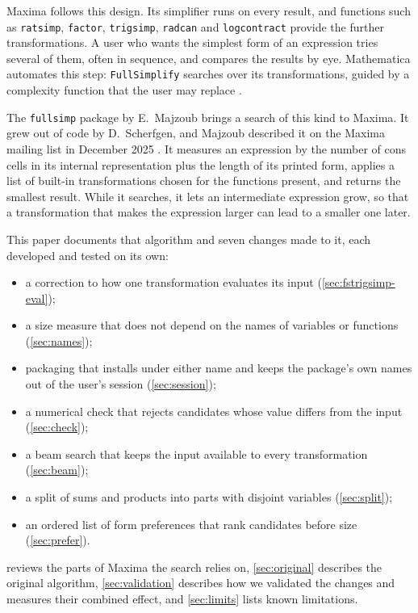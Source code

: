 \documentclass[11pt]{amsart}
\newcommand{\mx}{\lstinline[style=mx]}
\theoremstyle{definition}
\theoremstyle{remark}
\begin{document}
Maxima \cite{Maxima} follows this design. Its simplifier runs on every
result, and functions such as \mx|ratsimp|, \mx|factor|, \mx|trigsimp|,
\mx|radcan| and \mx|logcontract| provide the further transformations. A user
who wants the simplest form of an expression tries several of them, often in
sequence, and compares the results by eye. Mathematica automates this step:
\texttt{FullSimplify} searches over its transformations, guided by a
complexity function that the user may replace \cite{WolframFullSimplify}.

The \texttt{fullsimp} package by E.~Majzoub \cite{fullsimp} brings a search
of this kind to Maxima. It grew out of code by D.~Scherfgen, and Majzoub
described it on the Maxima mailing list in December 2025 \cite{Majzoub25}. It
measures an expression by the number of cons cells in its internal
representation plus the length of its printed form, applies a list of
built-in transformations chosen for the functions present, and returns the
smallest result. While it searches, it lets an intermediate expression grow,
so that a transformation that makes the expression larger can lead to a
smaller one later.

This paper documents that algorithm and seven changes made to it, each
developed and tested on its own:
\begin{itemize}
\item a correction to how one transformation evaluates its input
  (\cref{sec:fstrigsimp-eval});
\item a size measure that does not depend on the names of variables or
  functions (\cref{sec:names});
\item packaging that installs under either name and keeps the package's own
  names out of the user's session (\cref{sec:session});
\item a numerical check that rejects candidates whose value differs from the
  input (\cref{sec:check});
\item a beam search that keeps the input available to every transformation
  (\cref{sec:beam});
\item a split of sums and products into parts with disjoint variables
  (\cref{sec:split});
\item an ordered list of form preferences that rank candidates before size
  (\cref{sec:prefer}).
\end{itemize}
 reviews the parts of Maxima the search relies on,
\cref{sec:original} describes the original algorithm, \cref{sec:validation}
describes how we validated the changes and measures their combined effect,
and \cref{sec:limits} lists known limitations.
\end{document}
